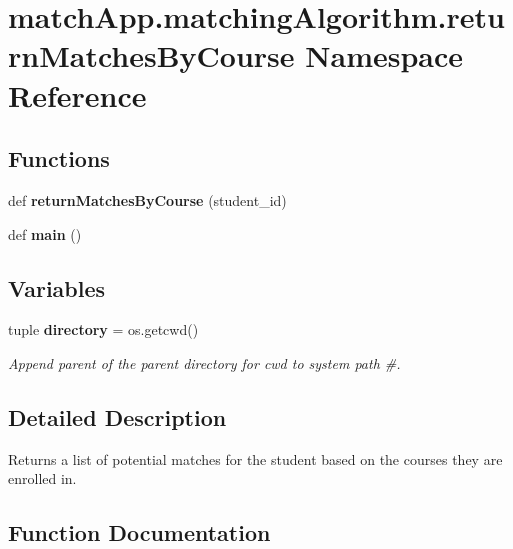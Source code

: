 \section{match\+App.\+matching\+Algorithm.\+return\+Matches\+By\+Course Namespace Reference}
\label{namespacematch_app_1_1matching_algorithm_1_1return_matches_by_course}
\subsection*{Functions}
\begin{DoxyCompactItemize}
\item 
def {\bf return\+Matches\+By\+Course} (student\+\_\+id)
\item 
def {\bf main} ()
\end{DoxyCompactItemize}
\subsection*{Variables}
\begin{DoxyCompactItemize}
\item 
tuple {\bf directory} = os.\+getcwd()
\begin{DoxyCompactList}\small\item\em Append parent of the parent directory for cwd to system path \#. \end{DoxyCompactList}\end{DoxyCompactItemize}


\subsection{Detailed Description}
\begin{DoxyVerb}Returns a list of potential matches for the student based on the courses they are enrolled in. \end{DoxyVerb}
 

\subsection{Function Documentation}
